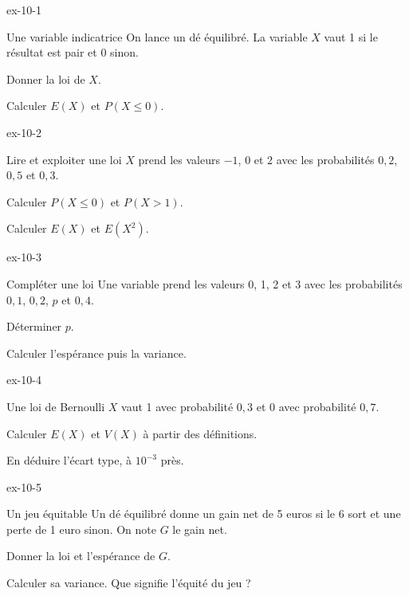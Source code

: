 \begin{blocLivre}{ex-10-1}
\begin{exercice}[1]{Une variable indicatrice}
On lance un dé équilibré. La variable $X$ vaut 1 si le résultat est pair et 0 sinon.\begin{questions}
\item Donner la loi de $X$.
\item Calculer $E(X)$ et $P(X\leq0)$.
\end{questions}
\end{exercice}
\end{blocLivre}
\begin{blocLivre}{ex-10-2}
\begin{exercice}[1]{Lire et exploiter une loi}
$X$ prend les valeurs $-1$, 0 et 2 avec les probabilités $0{,}2$, $0{,}5$ et $0{,}3$.\begin{questions}
\item Calculer $P(X\leq0)$ et $P(X>1)$.
\item Calculer $E(X)$ et $E(X^2)$.
\end{questions}
\end{exercice}
\end{blocLivre}
\begin{blocLivre}{ex-10-3}
\begin{exercice}[1]{Compléter une loi}
Une variable prend les valeurs 0, 1, 2 et 3 avec les probabilités $0{,}1$, $0{,}2$, $p$ et $0{,}4$.\begin{questions}
\item Déterminer $p$.
\item Calculer l’espérance puis la variance.
\end{questions}
\end{exercice}
\end{blocLivre}
\begin{blocLivre}{ex-10-4}
\begin{exercice}[1]{Une loi de Bernoulli}
$X$ vaut 1 avec probabilité $0{,}3$ et 0 avec probabilité $0{,}7$.\begin{questions}
\item Calculer $E(X)$ et $V(X)$ à partir des définitions.
\item En déduire l’écart type, à $10^{-3}$ près.
\end{questions}
\end{exercice}
\end{blocLivre}
\begin{blocLivre}{ex-10-5}
\begin{exercice}[1]{Un jeu équitable}
Un dé équilibré donne un gain net de 5 euros si le 6 sort et une perte de 1 euro sinon. On note $G$ le gain net.\begin{questions}
\item Donner la loi et l’espérance de $G$.
\item Calculer sa variance. Que signifie l’équité du jeu ?
\end{questions}
\end{exercice}
\end{blocLivre}
